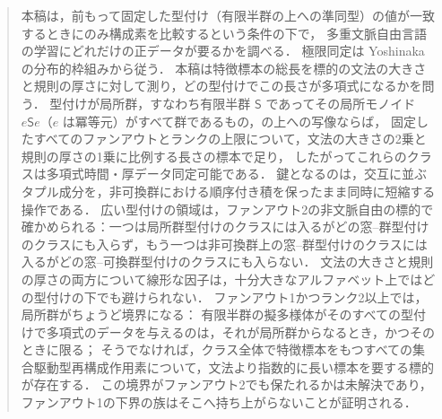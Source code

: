 \begin{abstract}
本稿は，前もって固定した型付け（有限半群の上への準同型）の値が一致するときにのみ構成素を比較するという条件の下で，
多重文脈自由言語の学習にどれだけの正データが要るかを調べる．
極限同定は Yoshinaka の分布的枠組みから従う．
本稿は特徴標本の総長を標的の文法の大きさと規則の厚さに対して測り，どの型付けでこの長さが多項式になるかを問う．
型付けが局所群，すなわち有限半群 $\mathsf S$ であってその局所モノイド $e\mathsf Se$（$e$ は冪等元）がすべて群であるもの，の上への写像ならば，
固定したすべてのファンアウトとランクの上限について，文法の大きさの2乗と規則の厚さの1乗に比例する長さの標本で足り，
したがってこれらのクラスは多項式時間・厚データ同定可能である．
鍵となるのは，交互に並ぶタプル成分を，非可換群における順序付き積を保ったまま同時に短縮する操作である．
広い型付けの領域は，ファンアウト2の非文脈自由の標的で確かめられる：一つは局所群型付けのクラスには入るがどの窓--群型付けのクラスにも入らず，もう一つは非可換群上の窓--群型付けのクラスには入るがどの窓--可換群型付けのクラスにも入らない．
文法の大きさと規則の厚さの両方について線形な因子は，十分大きなアルファベット上ではどの型付けの下でも避けられない．
ファンアウト1かつランク2以上では，局所群がちょうど境界になる：
有限半群の擬多様体がそのすべての型付けで多項式のデータを与えるのは，それが局所群からなるとき，かつそのときに限る；
そうでなければ，クラス全体で特徴標本をもつすべての集合駆動型再構成作用素について，文法より指数的に長い標本を要する標的が存在する．
この境界がファンアウト2でも保たれるかは未解決であり，ファンアウト1の下界の族はそこへ持ち上がらないことが証明される．
\end{abstract}

